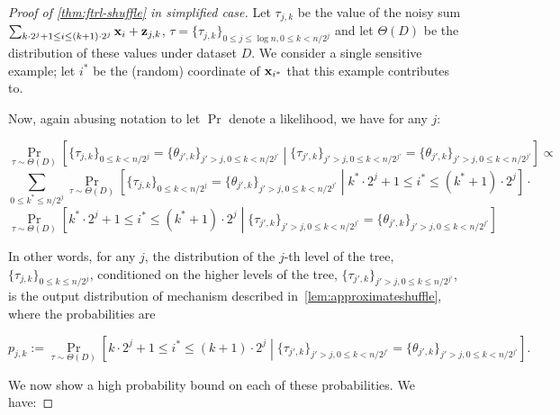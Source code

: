 \begin{proof}[Proof of \cref{thm:ftrl-shuffle} in simplified case]
Let $\tau_{j,k}$ be the value of the noisy sum $\sum_{k \cdot 2^j + 1 \leq i \leq (k+1) \cdot 2^j} \mathbf{x}_i + \mathbf{z}_{j,k}$, $\tau = \{\tau_{j,k}\}_{0 \leq j \leq \log n, 0 \leq k < n/2^j}$ and let $\Theta(D)$ be the distribution of these values under dataset $D$. We consider a single sensitive example; 
let $i^*$ be the (random) coordinate of $\mathbf{x}_{i^*}$ that this example contributes to. 

Now, again abusing notation to let $\Pr$ denote a likelihood, we have for any $j$:

\[\Pr_{\tau \sim \Theta(D)}\left[\{\tau_{j,k}\}_{0 \leq k < n/2^j} = \{\theta_{j',k}\}_{j' > j, 0 \leq k < n/2^{j'}}\middle| \{\tau_{j',k}\}_{j' > j, 0 \leq k < n/2^{j'}} = \{\theta_{j',k}\}_{j' > j, 0 \leq k < n/2^{j'}}\right] \propto \]
\[\sum_{0 \leq k^* \leq n/2^j} \Pr_{\tau \sim \Theta(D)}\left[\{\tau_{j,k}\}_{0 \leq k < n/2^j} = \{\theta_{j',k}\}_{j' > j, 0 \leq k < n/2^{j'}}\middle| k^* \cdot 2^j + 1 \leq i^* \leq (k^*+1) \cdot 2^j\right] \cdot \]
\[\Pr_{\tau \sim \Theta(D)}\left[k^* \cdot 2^j + 1 \leq i^* \leq (k^*+1) \cdot 2^j\middle| \{\tau_{j',k}\}_{j' > j, 0 \leq k < n/2^{j'}} = \{\theta_{j',k}\}_{j' > j, 0 \leq k < n/2^{j'}}\right]\]

In other words, for any $j$, the distribution of the $j$-th level of the tree, $\{\tau_{j,k}\}_{0 \leq k \leq n/2^j}$, conditioned on the higher levels of the tree, $\{\tau_{j',k}\}_{j' > j, 0 \leq k \leq n/2^{j'}}$, is the output distribution of mechanism described  in~\cref{lem:approximateshuffle}, where the probabilities are 

\[p_{j,k} := \Pr_{\tau \sim \Theta(D)}\left[k \cdot 2^j + 1 \leq i^* \leq (k+1) \cdot 2^j \middle|\{\tau_{j',k}\}_{j' > j, 0 \leq k < n/2^{j'}} = \{\theta_{j',k}\}_{j' > j, 0 \leq k < n/2^{j'}}\right].\]

We now show a high probability bound on each of these probabilities. We have:


\end{proof}
